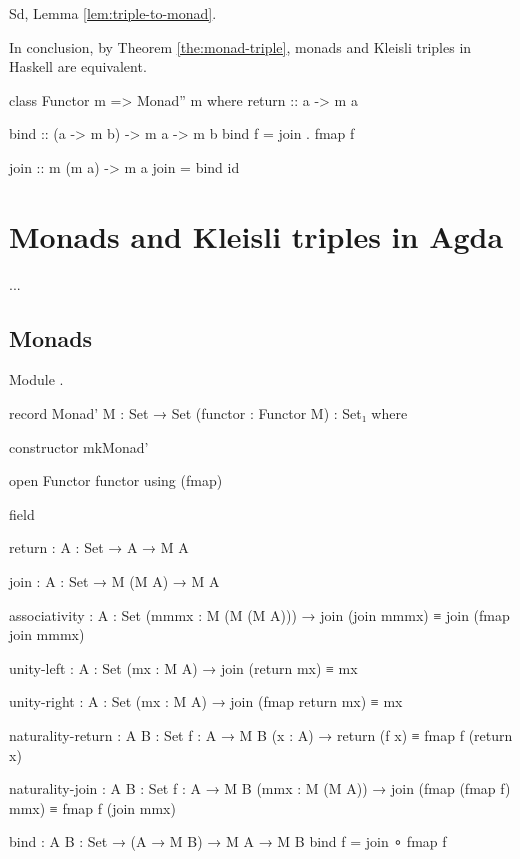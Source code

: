 Sd, Lemma \ref{lem:triple-to-monad}.

In conclusion, by Theorem \ref{the:monad-triple}, monads and Kleisli triples
in Haskell are equivalent.

\begin{codehaskell}
class Functor m => Monad'' m where
  return :: a -> m a

  bind :: (a -> m b) -> m a -> m b
  bind f = join . fmap f

  join :: m (m a) -> m a
  join = bind id
\end{codehaskell}

\section{Monads and Kleisli triples in Agda}
\label{sec:monads-agda}

...


\subsection*{Monads}

Module .

\begin{codeagda}
record Monad' {M : Set → Set} (functor : Functor M) : Set₁ where

  constructor mkMonad'

  open Functor functor using (fmap)

  field

    return : {A : Set} → A → M A

    join   : {A : Set} → M (M A) → M A

    associativity : {A : Set} (mmmx : M (M (M A))) →
                    join (join mmmx) ≡ join (fmap join mmmx)

    unity-left    : {A : Set} (mx : M A) → join (return mx) ≡ mx

    unity-right   : {A : Set} (mx : M A) → join (fmap return mx) ≡ mx

    naturality-return : {A B : Set} {f : A → M B} (x : A) →
                        return (f x) ≡ fmap f (return x)

    naturality-join   : {A B : Set} {f : A → M B} (mmx : M (M A)) →
                        join (fmap (fmap f) mmx) ≡ fmap f (join mmx)

  bind : {A B : Set} → (A → M B) → M A → M B
  bind f = join ∘ fmap f
\end{codeagda}

